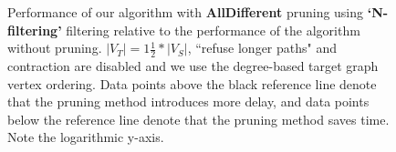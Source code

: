 \begin{figure}
\begin{subfigure} {0.5\linewidth}

\end{subfigure}

\caption{Performance of our algorithm with \textbf{AllDifferent} pruning using \textbf{`N-filtering'} filtering relative to the performance of the algorithm without pruning. $|V_T|=1\frac{1}{2}*|V_S|$, ``refuse longer paths" and contraction are disabled and we use the degree-based target graph vertex ordering. Data points above the black reference line denote that the pruning method introduces more delay, and data points below the reference line denote that the pruning method saves time. Note the logarithmic y-axis.}		
\label{fig:alldifferentNfiltering}
\end{figure}

